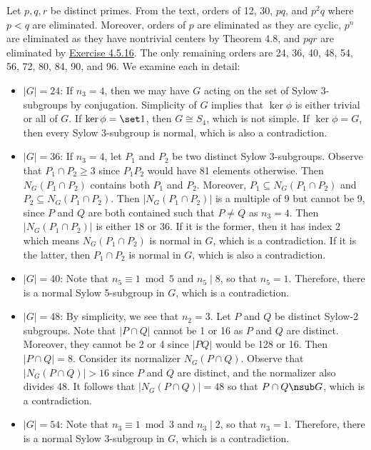 \begin{sol}
	Let $p, q, r$ be distinct primes. From the text, orders of 12, 30, $pq$, and $p^2q$ where $p < q$ are eliminated. Moreover, orders of $p$ are eliminated as they are cyclic, $p^n$ are eliminated as they have nontrivial centers by Theorem 4.8, and $pqr$ are eliminated by \hyperref[ex4.5.16]{Exercise 4.5.16}. The only remaining orders are 24, 36, 40, 48, 54, 56, 72, 80, 84, 90, and 96. We examine each in detail:
	\begin{itemize}
		\item $|G| = 24$: If $n_3 = 4$, then we may have $G$ acting on the set of Sylow 3-subgroups by conjugation. Simplicity of $G$ implies that $\ker\phi$ is either trivial or all of $G$. If $\ker\phi = \set 1$, then $G \cong S_4$, which is not simple. If $\ker\phi = G$, then every Sylow 3-subgroup is normal, which is also a contradiction. 
		\item $|G| = 36$: If $n_3 = 4$, let $P_1$ and $P_2$ be two distinct Sylow 3-subgroups. Observe that $P_1 \cap P_2 \geq 3$ since $P_1P_2$ would have 81 elements otherwise. Then $N_G(P_1 \cap P_2)$ contains both $P_1$ and $P_2$. Moreover, $P_1 \subseteq N_G(P_1 \cap P_2)$ and $P_2 \subseteq N_G(P_1 \cap P_2)$. Then $|N_G(P_1 \cap P_2)|$ is a multiple of 9 but cannot be 9, since $P$ and $Q$ are both contained such that $P \neq Q$ as $n_3 = 4$. Then $|N_G(P_1 \cap P_2)|$ is either 18 or 36. If it is the former, then it has index 2 which means $N_G(P_1 \cap P_2)$ is normal in $G$, which is a contradiction. If it is the latter, then $P_1 \cap P_2$ is normal in $G$, which is also a contradiction. 
		\item $|G| = 40$: Note that $n_5 \equiv 1 \bmod 5$ and $n_5 \mid 8$, so that $n_5 = 1$. Therefore, there is a normal Sylow 5-subgroup in $G$, which is a contradiction.
		\item $|G| = 48$: By simplicity, we see that $n_2 = 3$. Let $P$ and $Q$ be distinct Sylow-2 subgroups. Note that $|P \cap Q|$ cannot be 1 or 16 as $P$ and $Q$ are distinct. Moreover, they cannot be 2 or 4 since $|PQ|$ would be 128 or 16. Then $|P \cap Q| = 8$. Consider its normalizer $N_G(P \cap Q)$. Observe that $|N_G(P \cap Q)| > 16$ since $P$ and $Q$ are distinct, and the normalizer also divides 48. It follows that $|N_G(P \cap Q)| = 48$ so that $P \cap Q \nsub G$, which is a contradiction.
		\item $|G| = 54$: Note that $n_3 \equiv 1 \bmod 3$ and $n_3 \mid 2$, so that $n_3 = 1$. Therefore, there is a normal Sylow 3-subgroup in $G$, which is a contradiction.

\end{itemize}
\end{sol}
